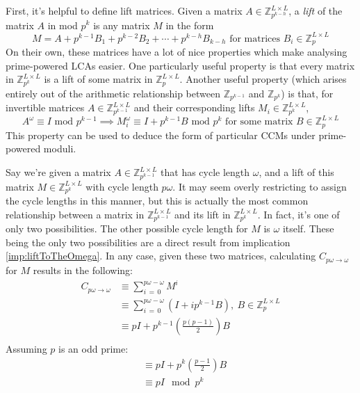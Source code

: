 \documentclass[a4paper, 12pt, reqno]{amsart}
\begin{document}
	First, it's helpful to define lift matrices. Given a matrix $A \in \mathds{Z}_{p^{k-h}}^{L \times L}$, a \emph{lift} of the matrix $A$ in mod $p^k$ is any matrix $M$ in 
	the form
	\[
		M = A + p^{k-1}B_{1} + p^{k-2}B_{2} + \cdots + p^{k-h}B_{k-h} \text{ for matrices } B_{i} \in \mathds{Z}_{p}^{L \times L}
	\]
	On their own, these matrices have a lot of nice properties which make analysing prime-powered LCAs easier. One particularly useful property is that every matrix in
	$\mathds{Z}_{p^k}^{L \times L}$ is a lift of some matrix in $\mathds{Z}_{p}^{L \times L}$. Another useful property (which arises entirely out of the arithmetic 
	relationship between $\mathds{Z}_{p^{k-1}}$ and $\mathds{Z}_{p^{k}}$) is that, for invertible matrices $A \in \mathds{Z}_{p^{k-1}}^{L \times L}$ and their corresponding 
	lifts $M_{i} \in \mathds{Z}_{p^k}^{L \times L}$,
	\begin{equation}
		\label{imp:liftToTheOmega}
		A^{\omega} \equiv I \text{ mod } p^{k-1} \implies M_{i}^{\omega} \equiv I + p^{k-1}B \text{ mod } p^{k} \text{ for some matrix } B \in \mathds{Z}_{p}^{L \times L}
	\end{equation}
	This property can be used to deduce the form of particular CCMs under prime-powered moduli.
	
	Say we're given a matrix $A \in \mathds{Z}_{p^{k-1}}^{L \times L}$ that has cycle length $\omega$, and a lift of this matrix $M \in \mathds{Z}_{p^{k}}^{L \times L}$
	with cycle length $p\omega$. It may seem overly restricting to assign the cycle lengths in this manner, but this is actually the most common relationship between a
	matrix in $\mathds{Z}_{p^{k-1}}^{L \times L}$ and its lift in $\mathds{Z}_{p^{k}}^{L \times L}$. In fact, it's one of only two possibilities. The other possible
	cycle length for $M$ is $\omega$ itself. These being the only two possibilities are a direct result from implication \ref{imp:liftToTheOmega}. In any case, given these
	two matrices, calculating $C_{p\omega \rightarrow \omega}$ for $M$ results in the following:
	\begin{align*}
		C_{p\omega \rightarrow \omega} & \equiv \sum_{i \, = \, 0}^{p\omega - \omega} M^i \\
		                               & \equiv \sum_{i \, = \, 0}^{p\omega - \omega} (I + ip^{k-1}B), \ B \in \mathds{Z}_{p}^{L \times L} \\
									   & \equiv pI + p^{k-1}(\frac{p(p-1)}{2})B \\
	\end{align*}
	Assuming $p$ is an odd prime:
	\begin{align*}
		& \equiv pI + p^{k}(\frac{p-1}{2})B \\
		& \equiv pI \mod{p^{k}}
	\end{align*}
	
\end{document}
